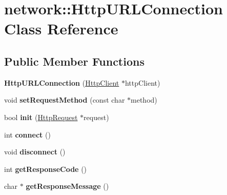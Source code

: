 \hypertarget{classnetwork_1_1HttpURLConnection}{}\section{network\+:\+:Http\+U\+R\+L\+Connection Class Reference}
\label{classnetwork_1_1HttpURLConnection}
\subsection*{Public Member Functions}
\begin{DoxyCompactItemize}
\item 
\mbox{\label{classnetwork_1_1HttpURLConnection_a85cde5325a44ef880e65ed74c3d81892}} 
{\bfseries Http\+U\+R\+L\+Connection} (\hyperlink{classnetwork_1_1HttpClient}{Http\+Client} $\ast$http\+Client)
\item 
\mbox{\label{classnetwork_1_1HttpURLConnection_a36935d5aa8a82d7824b6eeeeb768de83}} 
void {\bfseries set\+Request\+Method} (const char $\ast$method)
\item 
\mbox{\label{classnetwork_1_1HttpURLConnection_a7c458ccb35b13db139d496d252d0f2a1}} 
bool {\bfseries init} (\hyperlink{classnetwork_1_1HttpRequest}{Http\+Request} $\ast$request)
\item 
\mbox{\label{classnetwork_1_1HttpURLConnection_a9e17c1277637c2946036ef60afe184fb}} 
int {\bfseries connect} ()
\item 
\mbox{\label{classnetwork_1_1HttpURLConnection_aafb03cb47adca12fba23f983473def5c}} 
void {\bfseries disconnect} ()
\item 
\mbox{\label{classnetwork_1_1HttpURLConnection_a3e8dce620440ad709199a77bbfc94db0}} 
int {\bfseries get\+Response\+Code} ()
\item 
\mbox{\label{classnetwork_1_1HttpURLConnection_a5c743775419bfabd028da29e9d3f7cb4}} 
char $\ast$ {\bfseries get\+Response\+Message} ()
\item 

\end{DoxyCompactItemize}
